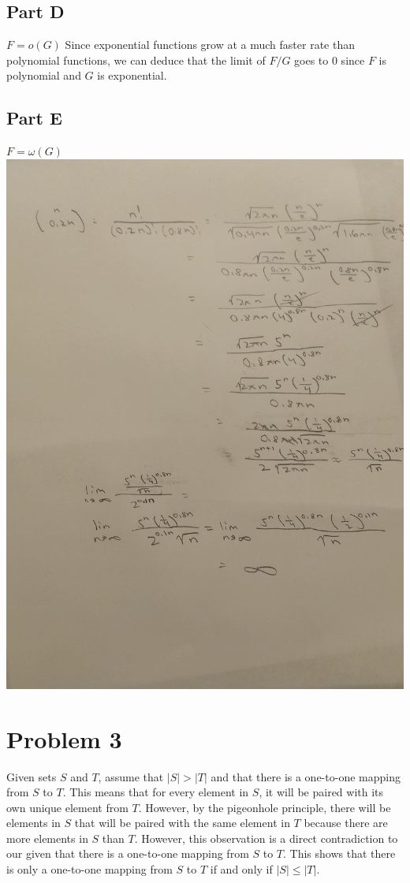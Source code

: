 \documentclass[12pt]{article}
\begin{document}
\subsection*{Part D}
$F=o(G)$
\newline
\newline
Since exponential functions grow at a much faster rate than polynomial functions, we can
deduce that the limit of $F/G$ goes to 0 since $F$ is polynomial and $G$ is exponential.
\subsection*{Part E}
$F=\omega(G)$
\newline
\newline
\includegraphics[scale=0.1, angle=-90]{problem2e.jpg}

\newpage
\section*{Problem 3}
Given sets $S$ and $T$, assume that $|S| > |T|$ and that there is a one-to-one mapping from $S$ to $T$.
This means that for every element in $S$, it will be paired with its own unique element from $T$. 
However, by the pigeonhole principle, there will be elements in $S$ that will be paired with the 
same element in $T$ because there are more elements in $S$ than $T$. However, this observation
is a direct contradiction to our given that there is a one-to-one mapping from $S$ to $T$. This shows
that there is only a one-to-one mapping from $S$ to $T$ if and only if $|S| \leq |T|$.
\end{document}
